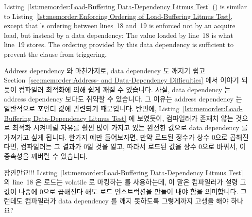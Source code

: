 Listing~\ref{lst:memorder:Load-Buffering Data-Dependency Litmus Test}
()
is similar to
Listing~\ref{lst:memorder:Enforcing Ordering of Load-Buffering Litmus Test},
except that 's ordering between lines~18 and~19 is
enforced not by an acquire load, but instead by a data dependency:
The value loaded by line~18 is what line~19 stores.
The ordering provided by this data dependency is sufficient to prevent
the  clause from triggering.
\fi

Address dependency 와 마찬가지로, data dependency 도 깨지기 쉽고
Section~\ref{sec:memorder:Address- and Data-Dependency Difficulties} 에서
이야기 되듯이 컴파일러 최적화에 의해 쉽게 깨질 수 있습니다.
사실, data dependency 는 address dependency 보다도 취약할 수 있습니다.
그 이유는 address dependency 는 일반적으로 포인터 값에 관련되기 때문입니다.
반면에,
Listing~\ref{lst:memorder:Load-Buffering Data-Dependency Litmus Test}
에 보였듯이, 컴파일러가 존재치 않는 것으로 최적화 시켜버릴 자유를 훨씬 많이
가지고 있는 완전한 값으로 data dependency 를 가져가고 싶게 됩니다.
한가지 예만 들어보자면, 만약 로드된 정수가 상수 0으로 곱해진다면, 컴파일러는 그
결과가 0일 것을 알고, 따라서 로드된 값을 상수 0으로 바꿔서, 이 종속성을 깨버릴
수 있습니다.

\QuickQuiz{}
	잠깐만요!!!
	Listing~\ref{lst:memorder:Load-Buffering Data-Dependency Litmus Test}
	의 line~18 은 로드는 volatile 로 마킹하는  를
	사용하는데, 이 말은 컴파일러가 설령 그 값이 나중에 0으로 곱해진다 해도
	로드 인스트럭션을 만들어 내야 함을 의미합니다.
	그런데도 컴파일러가 data dependency 를 깨지 못하도록 그렇게까지 고생을
	해야 하나요?
	\iffalse


